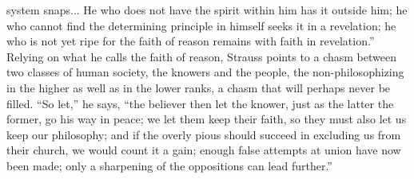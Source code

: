 \documentclass[12pt,a4paper]{article}
\begin{document}
system snaps... He who does not have the spirit within him has it
outside him; he who cannot find the determining principle in himself
seeks it in a revelation; he who is not yet ripe for the faith of
reason remains with faith in revelation.'' Relying on what he calls the
faith of reason, Strauss points to a chasm between two classes of human
society, the knowers and the people, the non-philosophizing in the
higher as well as in the lower ranks, a chasm that will perhaps never be
filled. ``So let,'' he says, ``the believer then let the knower, just as
the latter the former, go his way in peace; we let them keep their
faith, so they must also let us keep our philosophy; and if the overly
pious should succeed in excluding us from their church, we would count
it a gain; enough false attempts at union have now been made; only a
sharpening of the oppositions can lead further.''
\end{document}
